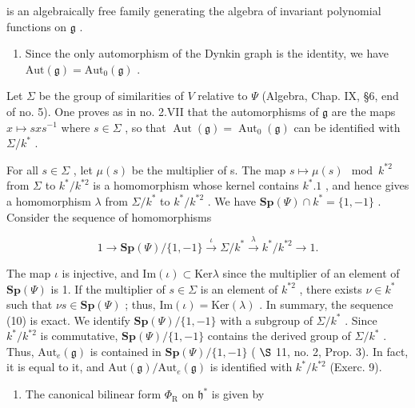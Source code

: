is an algebraically free family generating the algebra of invariant polynomial functions on \(\mathfrak{g}\) .

\begin{enumerate}
\def\labelenumi{(\Roman{enumi})}
\setcounter{enumi}{6}
\tightlist
\item
  Since the only automorphism of the Dynkin graph is the identity, we have \(\mathrm{Aut}(\mathfrak{g}) = \mathrm{Aut}_0(\mathfrak{g})\) .
\end{enumerate}

Let \(\Sigma\) be the group of similarities of \(V\) relative to \(\Psi\) (Algebra, Chap. IX, §6, end of no. 5). One proves as in no. 2.VII that the automorphisms of \(\mathfrak{g}\) are the maps \(x \mapsto sxs^{-1}\) where \(s \in \Sigma\) , so that \(\operatorname{Aut}(\mathfrak{g}) = \operatorname{Aut}_0(\mathfrak{g})\) can be identified with \(\Sigma / k^*\) .

For all \(s \in \Sigma\) , let \(\mu(s)\) be the multiplier of s. The map \(s \mapsto \mu(s) \mod k^{*2}\) from \(\Sigma\) to \(k^{*}/k^{*2}\) is a homomorphism whose kernel contains \(k^{*}.1\) , and hence gives a homomorphism \(\lambda\) from \(\Sigma/k^{*}\) to \(k^{*}/k^{*2}\) . We have \(\mathbf{Sp}(\varPsi) \cap k^{*} = \{1, -1\}\) . Consider the sequence of homomorphisms

\[
1 \longrightarrow \mathbf {S p} (\Psi) / \{1, - 1 \} \stackrel {{\iota}} {{\longrightarrow}} \Sigma / k ^ {*} \stackrel {{\lambda}} {{\longrightarrow}} k ^ {*} / k ^ {* 2} \longrightarrow 1.\tag{10}
\]

The map \(\iota\) is injective, and \(\mathrm{Im}(\iota) \subset \mathrm{Ker}\lambda\) since the multiplier of an element of \(\mathbf{Sp}(\varPsi)\) is 1. If the multiplier of \(s \in \varSigma\) is an element of \(k^{*2}\) , there exists \(\nu \in k^*\) such that \(\nu s \in \mathbf{Sp}(\varPsi)\) ; thus, \(\mathrm{Im}(\iota) = \mathrm{Ker}(\lambda)\) . In summary, the sequence (10) is exact. We identify \(\mathbf{Sp}(\varPsi)/\{1, -1\}\) with a subgroup of \(\varSigma/k^*\) . Since \(k^*/k^{*2}\) is commutative, \(\mathbf{Sp}(\varPsi)/\{1, -1\}\) contains the derived group of \(\varSigma/k^*\) . Thus, \(\mathrm{Aut}_e(\mathfrak{g})\) is contained in \(\mathbf{Sp}(\varPsi)/\{1, -1\}\) ( \(\S\) 11, no. 2, Prop. 3). In fact, it is equal to it, and \(\mathrm{Aut}(\mathfrak{g})/\mathrm{Aut}_e(\mathfrak{g})\) is identified with \(k^*/k^{*2}\) (Exerc. 9).

\begin{enumerate}
\def\labelenumi{(\Roman{enumi})}
\setcounter{enumi}{7}
\tightlist
\item
  The canonical bilinear form \(\Phi_{\mathrm{R}}\) on \(\mathfrak{h}^*\) is given by
\end{enumerate}

